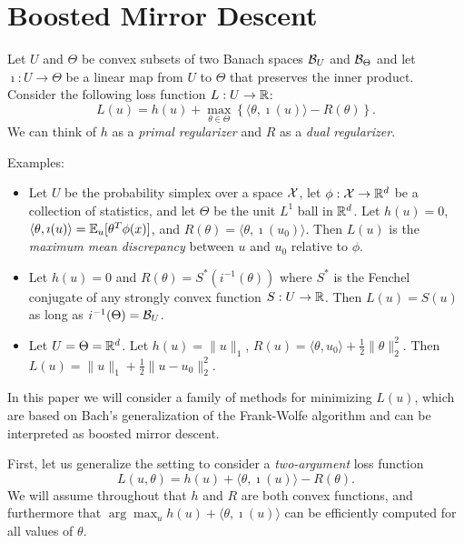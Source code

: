 \documentclass[paper.tex]{subfiles}
\begin{document}
\section{Boosted Mirror Descent}
\label{sec:algorithm}

Let $U$ and $\Theta$ be convex subsets of two Banach spaces $\mathcal{B}_{U}$ and $\mathcal{B}_{\Theta}$ and 
let $\imath : U \to \Theta$ be a linear map from 
$U$ to $\Theta$ that preserves the inner product. Consider the following loss function 
$L : U \to \mathbb{R}$:
\begin{equation}
L(u) = h(u) + \max_{\theta \in \Theta} \left\{\langle \theta, \imath(u) \rangle - R(\theta) \right\}.
\end{equation}
We can think of $h$ as a \emph{primal regularizer} and $R$ as a \emph{dual regularizer}. 

Examples:
\begin{itemize}
\item Let $U$ be the probability simplex over a space $\mathcal{X}$, let $\phi : \mathcal{X} \to \mathbb{R}^d$ be a collection 
      of statistics, and let $\Theta$ be the unit $L^1$ ball in $\mathbb{R}^d$. Let $h(u) = 0$, 
      $\langle \theta, \imath(u) \rangle = \mathbb{E}_u[\theta^T\phi(x)]$, and 
      $R(\theta) = \langle \theta, \imath(u_0) \rangle$. Then $L(u)$ is the 
      \emph{maximum mean discrepancy} between $u$ and $u_0$ relative to $\phi$.
\item Let $h(u) = 0$ and $R(\theta) = S^*(i^{-1}(\theta))$ where $S^*$ is the 
      Fenchel conjugate of any strongly convex function $S : U \to \mathbb{R}$. Then $L(u) = S(u)$ 
      as long as $i^{-1}(\Theta) = \mathcal{B}_{U}$.
\item Let $U = \Theta = \mathbb{R}^d$. Let $h(u) = \|u\|_1$, $R(u) = \langle \theta, u_0 \rangle + \frac{1}{2} \|\theta\|_2^2$. 
      Then $L(u) = \|u\|_1 + \frac{1}{2} \|u-u_0\|_2^2$. 
\end{itemize}

In this paper we will consider a family of methods for minimizing $L(u)$, 
which are based on Bach's generalization of the Frank-Wolfe algorithm and can 
be interpreted as boosted mirror descent.

First, let us generalize the setting 
to consider a \emph{two-argument} loss function
\begin{equation}
L(u,\theta) = h(u) + \langle \theta, \imath(u) \rangle - R(\theta).
\end{equation}
We will assume throughout that $h$ and $R$ are both convex functions, 
and furthermore that $\arg\max_{u} h(u) + \langle \theta, \imath(u) \rangle$ can be efficiently 
computed for all values of $\theta$.
\end{document}
